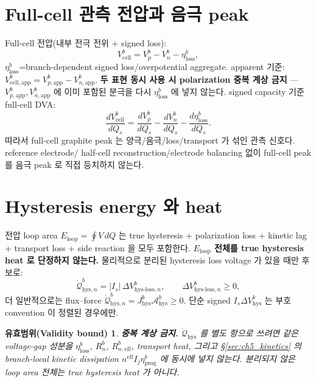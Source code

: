\documentclass[11pt,a4paper]{article}
\newtheorem*{boundbox}{유효범위(Validity bound)}
\newcommand{\eff}{\mathrm{eff}}
\newcommand{\app}{\mathrm{app}}
\newcommand{\cell}{\mathrm{cell}}
\newcommand{\prog}{\mathrm{prog}}
\newcommand{\hys}{\mathrm{hys}}
\newcommand{\loss}{\mathrm{loss}}
\begin{document}
\section{Full-cell 관측 전압과 음극 peak}\label{sec:ch5_fullcell}
Full-cell 전압(내부 전극 전위 + signed loss):
\begin{equation}
V_\cell^b=V_p^b-V_n^b-\eta_\loss^b,
\label{eq:ch5_fullcell}
\end{equation}
$\eta_\loss^b$=branch-dependent signed loss/overpotential aggregate. apparent 기준:
$V_{\cell,\app}^b=V_{p,\app}^b-V_{n,\app}^b$. \textbf{두 표현 동시 사용 시 polarization 중복 계상 금지} —
$V_{p,\app}^b,V_{n,\app}^b$ 에 이미 포함된 분극을 다시 $\eta_\loss^b$ 에 넣지 않는다. signed capacity 기준
full-cell DVA:
\begin{equation}
\frac{dV_\cell^b}{dQ_s}=\frac{dV_p^b}{dQ_s}-\frac{dV_n^b}{dQ_s}-\frac{d\eta_\loss^b}{dQ_s}.
\label{eq:ch5_fullcell_dva}
\end{equation}
따라서 full-cell graphite peak 는 양극/음극/loss/transport 가 섞인 관측 신호다. reference electrode/
half-cell reconstruction/electrode balancing 없이 full-cell peak 를 음극 peak 로 직접 등치하지 않는다.

\section{Hysteresis energy 와 heat}\label{sec:ch5_hysheat}
전압 loop area $E_{\mathrm{loop}}=\oint V\,dQ$ 는 true hysteresis + polarization loss + kinetic lag +
transport loss + side reaction 을 모두 포함한다. \textbf{$E_{\mathrm{loop}}$ 전체를 true hysteresis heat 로
단정하지 않는다.} 물리적으로 분리된 hysteresis loss voltage 가 있을 때만 후보로:
\begin{equation}
\dot{\mathcal Q}_{\hys,n}^b=|I_s|\,\Delta V_{\hys\text{-}\loss,n}^b,\qquad \Delta V_{\hys\text{-}\loss,n}^b\ge0,
\label{eq:ch5_hys_heat}
\end{equation}
더 일반적으로는 flux--force $\dot{\mathcal Q}_{\hys,n}^b=J_\hys^b\mathcal A_\hys^b\ge0$. 단순 signed
$I_s\Delta V_\hys^b$ 는 부호 convention 이 정렬된 경우에만.
\begin{boundbox}
\textbf{중복 계상 금지.} $\dot{\mathcal Q}_\hys$ 를 별도 항으로 쓰려면 같은 voltage-gap 성분을 $\eta_\loss^b$,
$R_n^b$, $R_{n,\eff}^b$, transport heat, 그리고 \S\ref{sec:ch5_kinetics} 의 branch-local kinetic dissipation
$n^{\eff}I_j\eta_{\prog}^b$ 에 동시에 넣지 않는다. 분리되지 않은 loop area 전체는 true hysteresis heat 가 아니다.
\end{boundbox}
\end{document}
